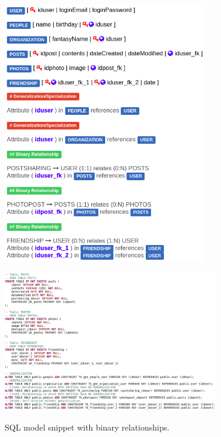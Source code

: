 \begin{figure}[!htb]
\begin{minipage}[b]{0.5\textwidth}
    \includegraphics[width=0.8\textwidth]{img/Logical_binary.png}
  \end{minipage}
\end{figure}

\begin{figure}[!htb]
    \centering
    \caption{SQL model snippet with binary relationships.}
    \includegraphics[width=0.85\textwidth]{img/SQL_Binary.png}
    \label{fig:SQL_Binary}
\end{figure}

